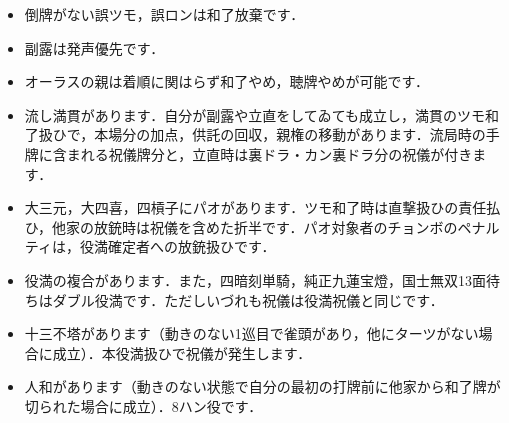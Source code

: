 \documentclass[uplatex]{jsarticle}
\begin{document}
\begin{itemize}
    \item 倒牌がない誤ツモ，誤ロンは和了放棄です．
    \item 副露は発声優先です．
    \item オーラスの親は着順に関はらず和了やめ，聴牌やめが可能です．
    \item 流し満貫があります．自分が副露や立直をしてゐても成立し，満貫のツモ和了扱ひで，本場分の加点，供託の回収，親権の移動があります．流局時の手牌に含まれる祝儀牌分と，立直時は裏ドラ・カン裏ドラ分の祝儀が付きます．
    \item 大三元，大四喜，四槓子にパオがあります．ツモ和了時は直撃扱ひの責任払ひ，他家の放銃時は祝儀を含めた折半です．パオ対象者のチョンボのペナルティは，役満確定者への放銃扱ひです．
    \item 役満の複合があります．また，四暗刻単騎，純正九蓮宝燈，国士無双13面待ちはダブル役満です．ただしいづれも祝儀は役満祝儀と同じです．
    \item 十三不塔があります（動きのない1巡目で雀頭があり，他にターツがない場合に成立）．本役満扱ひで祝儀が発生します．
    \item 人和があります（動きのない状態で自分の最初の打牌前に他家から和了牌が切られた場合に成立）．8ハン役です．
    \end{itemize}
\end{document}
